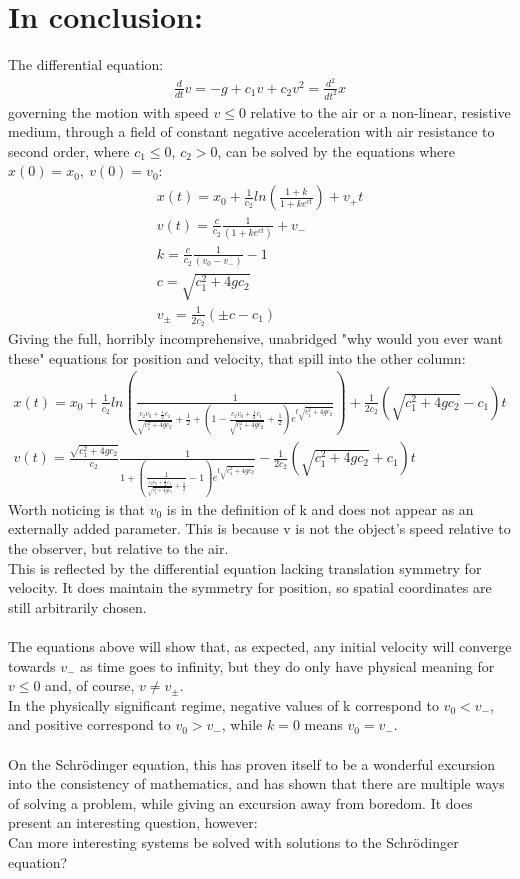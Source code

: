 \documentclass[english,a4paper,oneside,article,9pt]{memoir}
\begin{document}
\chapter{In conclusion:}
The differential equation:
\begin{align*}
\frac{d}{dt} v=-g+c_1v+c_2v^2=\frac{d^2}{dt^2}x
\end{align*}
governing the motion with speed $v\leq 0$ relative to the air or a non-linear, resistive medium, through a field of constant negative acceleration with air resistance to second order, where $c_1\leq 0$, $c_2>0$, can be solved by the equations where $x(0)=x_0,\ v(0)=v_0$:
\begin{align*}
x(t)=x_0+\frac{1}{c_2}ln(\frac{1+k}{1+ke^{ct}})+v_+t\\
v(t)=\frac{c}{c_2}\frac{1}{(1+ke^{ct})}+v_-\\
k=\frac{c}{c_2}\frac{1}{(v_0-v_-)}-1\\
c=\sqrt{c_1^2+4gc_2}\\
v_\pm=\frac{1}{2c_2}(\pm c-c_1)
\end{align*}
Giving the full, horribly incomprehensive, unabridged "why would you ever want these" equations for position and velocity, that spill into the other column:
\begin{align*}
x(t)=x_0+\frac{1}{c_2}ln\left(\frac{1}{\frac{c_2v_0+\frac{1}{2}c_1}{\sqrt{c_1^2+4gc_2}}+\frac{1}{2}+(1-\frac{c_2v_0+\frac{1}{2}c_1}{\sqrt{c_1^2+4gc_2}}+\frac{1}{2})e^{t\sqrt{c_1^2+4gc_2}}}\right)+\frac{1}{2c_2}(\sqrt{c_1^2+4gc_2}-c_1)t\\
v(t)=\frac{\sqrt{c_1^2+4gc_2}}{c_2}\frac{1}{1+\left(\frac{1}{\frac{c_2v_0+\frac{1}{2}c_1}{\sqrt{c_1^2+4gc_2}}+\frac{1}{2}}-1\right)e^{t\sqrt{c_1^2+4gc_2}}}-\frac{1}{2c_2}(\sqrt{c_1^2+4gc_2}+c_1)t
\end{align*}
Worth noticing is that $v_0$ is in the definition of k and does not appear as an externally added parameter. This is because v is not the object's speed relative to the observer, but relative to the air.\\
This is reflected by the differential equation lacking translation symmetry for velocity. It does maintain the symmetry for position, so spatial coordinates are still arbitrarily chosen.\\
\\
The equations above will show that, as expected, any initial velocity will converge towards $v_-$ as time goes to infinity, but they do only have physical meaning for $v\leq 0$ and, of course, $v\neq v_\pm$.\\
In the physically significant regime, negative values of k correspond to $v_0<v_-$, and positive correspond to $v_0>v_-$, while $k=0$ means $v_0=v_-$.\\
\\
On the Schrödinger equation, this has proven itself to be a wonderful excursion into the consistency of mathematics, and has shown that there are multiple ways of solving a problem, while giving an excursion away from boredom. It does present an interesting question, however:\\
Can more interesting systems be solved with solutions to the Schrödinger equation?
\end{document}
